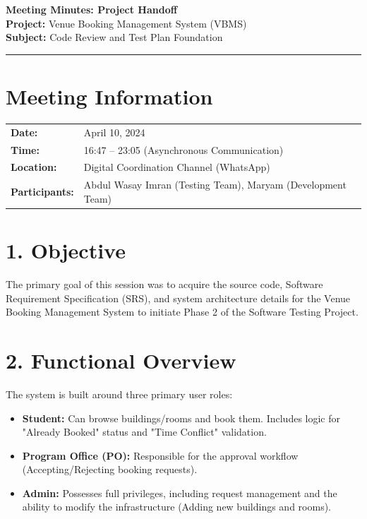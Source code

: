 \documentclass[11pt]{article}
\begin{document}
\begin{center}
    \huge \textbf{Meeting Minutes: Project Handoff} \\
    \large \textbf{Project:} Venue Booking Management System (VBMS) \\
    \large \textbf{Subject:} Code Review and Test Plan Foundation \\
    \rule{\textwidth}{0.4pt}
\end{center}

\section*{Meeting Information}
\begin{tabularx}{\textwidth}{l X}
    \textbf{Date:} & April 10, 2024 \\
    \textbf{Time:} & 16:47 -- 23:05 (Asynchronous Communication) \\
    \textbf{Location:} & Digital Coordination Channel (WhatsApp) \\
    \textbf{Participants:} & Abdul Wasay Imran (Testing Team), Maryam (Development Team) \\
\end{tabularx}

\section*{1. Objective}
The primary goal of this session was to acquire the source code, Software Requirement Specification (SRS), and system architecture details for the Venue Booking Management System to initiate Phase 2 of the Software Testing Project.

\section*{2. Functional Overview}
The system is built around three primary user roles:
\begin{itemize}[noitemsep]
    \item \textbf{Student:} Can browse buildings/rooms and book them. Includes logic for "Already Booked" status and "Time Conflict" validation.
    \item \textbf{Program Office (PO):} Responsible for the approval workflow (Accepting/Rejecting booking requests).
    \item \textbf{Admin:} Possesses full privileges, including request management and the ability to modify the infrastructure (Adding new buildings and rooms).
\end{itemize}
\end{document}
